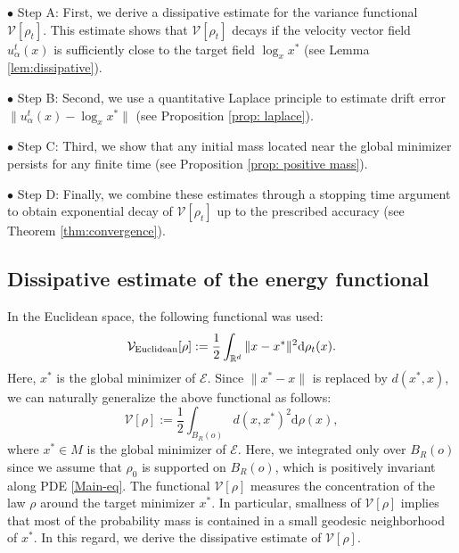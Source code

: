 \documentclass[11pt]{amsart}
\newcommand{\bbr}{\mathbb R}
\def\d{\mathrm{d}}
\newcommand{\dm}{d} %
\newcommand{\p}{o}%
\newcommand{\dist}{d}%
\begin{document}
\noindent $\bullet$ Step A: First, we derive a dissipative estimate for the variance functional $\mathcal V[\rho_t]$. This estimate shows that $\mathcal V[\rho_t]$ decays if the velocity vector field $u_\alpha^t(x)$ is sufficiently close to the target field $\log_xx^*$ (see Lemma \ref{lem:dissipative}).  

\vspace{0.2cm}

\noindent $\bullet$ Step B: Second, we use a quantitative Laplace principle to estimate drift error $\|u_\alpha^t(x) - \log_xx^*\|$ (see Proposition \ref{prop: laplace}). 

\vspace{0.2cm}

\noindent $\bullet$ Step C: Third, we show that any initial mass located near the global minimizer persists for any finite time (see Proposition \ref{prop: positive mass}). 

\vspace{0.2cm}

\noindent $\bullet$ Step D: Finally, we combine these estimates through a stopping time argument to obtain exponential decay of $\mathcal V[\rho_t]$ up to the prescribed accuracy (see Theorem \ref{thm:convergence}).  






\subsection{Dissipative estimate of the energy functional}
In the Euclidean space, the following functional was used:
\[
\mathcal{V}_{\textup{Euclidean}}[\rho] :=\frac{1}{2}\int_{\bbr^\dm}\|x-x^*\|^2\d\rho_t(x).
\]
Here, $x^*$ is the global minimizer of $\mathcal{E}$. Since $\|x^*-x\|$ is replaced by $\dist(x^*,x)$, we can naturally generalize the above functional as follows:
\[
\mathcal{V}[\rho] :=\frac{1}{2}\int_{B_R(\p)}\dist(x, x^*)^2\d\rho(x),
\]
where $x^*\in M$ is the global minimizer of $\mathcal{E}$. Here, we   integrated only over $B_R(\p)$ since we assume that $\rho_0$ is supported on $B_R(\p)$, which is positively invariant along PDE \eqref{Main-eq}. The functional $\mathcal V[\rho]$ measures the concentration of the law $\rho$ around the target minimizer $x^*$. In particular, smallness of $\mathcal V[\rho]$ implies that most of the probability mass is contained in a small geodesic neighborhood of $x^*$. In this regard, we derive the dissipative estimate of $\mathcal V[\rho]$.
 
\end{document}
